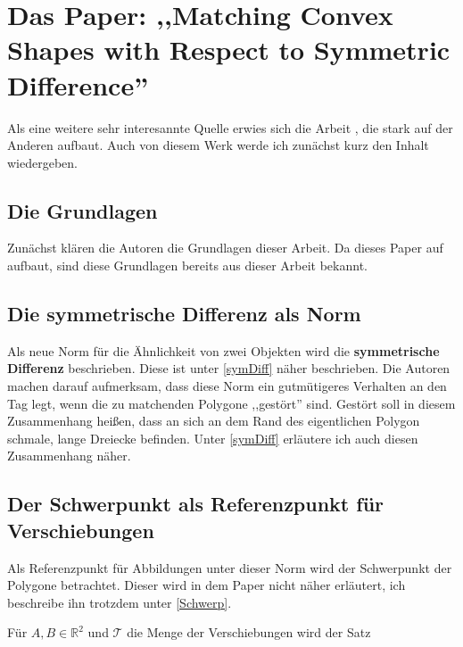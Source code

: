 \section[Matching Shapes with Symmetric Difference]{Das Paper: ,,Matching Convex Shapes with Respect to Symmetric Difference'' }\label{AFRWW}

Als eine weitere sehr interesannte Quelle erwies sich die Arbeit \cite{AFRW}, die stark auf der Anderen aufbaut. Auch von diesem Werk werde ich zunächst kurz den Inhalt wiedergeben.

\subsection{Die Grundlagen}

Zunächst klären die Autoren die Grundlagen dieser Arbeit. Da dieses Paper auf \cite{AAR} aufbaut, sind diese Grundlagen bereits aus dieser Arbeit bekannt. 

\subsection{Die symmetrische Differenz als Norm}

Als neue Norm für die Ähnlichkeit von zwei Objekten wird die \textbf{symmetrische Differenz} beschrieben. Diese ist unter  \ref{symDiff} näher beschrieben. Die Autoren machen darauf aufmerksam, dass diese Norm ein gutmütigeres Verhalten an den Tag legt, wenn die zu matchenden Polygone ,,gestört'' sind. Gestört soll in diesem Zusammenhang heißen, dass an sich an dem Rand des eigentlichen Polygon schmale, lange Dreiecke befinden. Unter \ref{symDiff} erläutere ich auch diesen Zusammenhang näher.

\subsection{Der Schwerpunkt als Referenzpunkt für Verschiebungen}

Als Referenzpunkt für Abbildungen unter dieser Norm wird der Schwerpunkt der Polygone betrachtet. Dieser wird in dem Paper  nicht näher erläutert, ich beschreibe ihn trotzdem unter \ref{Schwerp}. 

Für $A, B \in \mathbb{R}^2$ und $\mathcal{T}$ die Menge der Verschiebungen wird der Satz

